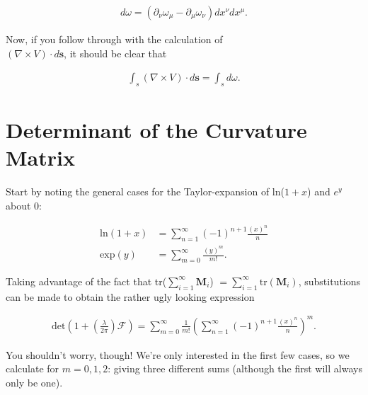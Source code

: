 \documentclass[fleqn, twocolumn, 10pt]{article}
\begin{document}
\begin{ceqn}
\begin{align*}
d\omega = (\partial_\nu \omega_\mu - \partial_\mu \omega_\nu) dx^\nu dx^\mu.
\end{align*}
\end{ceqn}
Now, if you follow through with the calculation of \\$(\nabla \times V)\cdot d\mathbf{s}$, it should be clear that

\begin{ceqn}
\begin{align*}
\int_s (\nabla \times V)\cdot d\mathbf{s} = \int_s d\omega.
\end{align*}
\end{ceqn}


\section{Determinant of the Curvature Matrix}

Start by noting the general cases for the Taylor-expansion of ln($1+x$) and $e^{y}$ about $0$:

\begin{ceqn}
\begin{align*}
\text{ln}(1+x) &= \sum_{n = 1}^{\infty} (-1)^{n+1}\frac{(x)^n}{n}\\
\text{exp}(y) &= \sum_{m = 0}^{\infty} \frac{(y)^m}{m!}.
\end{align*}
\end{ceqn}
Taking advantage of the fact that tr($\sum_{i = 1}^{\infty} \mathbf{M}_i$) $ = \sum_{i = 1}^{\infty} \text{tr}(\mathbf{M}_i)$, substitutions can be made to obtain the rather ugly looking expression

\begin{ceqn}
\begin{align*}
\text{det}\left(1+\left(\frac{\lambda}{2\pi}\right)\mathcal{F}\right) = \sum_{m = 0}^{\infty} \frac{1}{m!}\left(\sum_{n = 1}^{\infty} (-1)^{n+1}\frac{(x)^n}{n}\right)^m.
\end{align*}
\end{ceqn}
You shouldn't worry, though! We're only interested in the first few cases, so we calculate for $m=0,1,2$: giving three different sums (although the first will always only be one).
\end{document}
